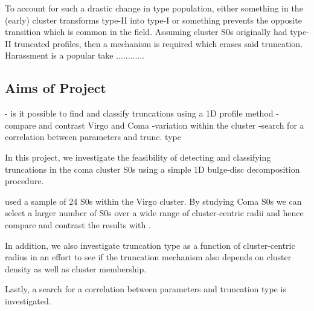 To account for such a drastic change in type population, either something in the (early) cluster transforms type-II into type-I or something prevents the opposite transition which is common in the field. Assuming cluster S0s originally had type-II truncated profiles, then a mechanism is required which erases said truncation. Harassment is a popular take ............

\subsection{Aims of Project}
- is it possible to find and classify truncations using a 1D profile method
-compare and contrast Virgo and Coma
-variation within the cluster
-search for a correlation between \sersic parameters and trunc. type

In this project, we investigate the feasibility of detecting and classifying truncations in the coma cluster S0s using a simple 1D bulge-disc decomposition procedure. 

\citet{erwin_strong_2012} used a sample of 24 S0s within the Virgo cluster. By studying Coma S0s we can select a larger number of S0s over a wide range of cluster-centric radii and hence compare and contrast the results with \citet{erwin_strong_2012}. 

In addition, we also investigate truncation type as a function of cluster-centric radius in an effort to see if the truncation mechanism also depends on cluster density as well as cluster membership.

Lastly, a search for a correlation between \sersic parameters and truncation type is investigated.

